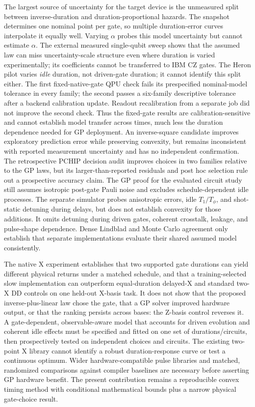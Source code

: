 \documentclass[10pt,letterpaper,journal]{IEEEtran}
\begin{document}
The largest source of uncertainty for the target device is the unmeasured split between inverse-duration and duration-proportional hazards. The snapshot determines one nominal point per gate, so multiple duration-error curves interpolate it equally well. Varying $\alpha$ probes this model uncertainty but cannot estimate $\alpha$. The external measured single-qubit sweep shows that the assumed law can miss uncertainty-scale structure even where duration is varied experimentally; its coefficients cannot be transferred to IBM CZ gates. The Heron pilot varies \emph{idle} duration, not driven-gate duration; it cannot identify this split either. The first fixed-native-gate QPU check fails its prespecified nominal-model tolerance in every family; the second passes a six-family descriptive tolerance after a backend calibration update. Readout recalibration from a separate job did not improve the second check. Thus the fixed-gate results are calibration-sensitive and cannot establish model transfer across times, much less the duration dependence needed for GP deployment. An inverse-square candidate improves exploratory prediction error while preserving convexity, but remains inconsistent with reported measurement uncertainty and has no independent confirmation. The retrospective PCHIP decision audit improves choices in two families relative to the GP laws, but its larger-than-reported residuals and post hoc selection rule out a prospective accuracy claim. The GP proof for the evaluated circuit study still assumes isotropic post-gate Pauli noise and excludes schedule-dependent idle processes. The separate simulator probes anisotropic errors, idle $T_1/T_\phi$, and shot-static detuning during delays, but does not establish convexity for those additions. It omits detuning during driven gates, coherent crosstalk, leakage, and pulse-shape dependence. Dense Lindblad and Monte Carlo agreement only establish that separate implementations evaluate their shared assumed model consistently.

The native X experiment establishes that two supported gate durations can yield different physical returns under a matched schedule, and that a training-selected slow implementation can outperform equal-duration delayed-X and standard two-X DD controls on one held-out X-basis task. It does not show that the proposed inverse-plus-linear law chose the gate, that a GP solver improved hardware output, or that the ranking persists across bases: the Z-basis control reverses it. A gate-dependent, observable-aware model that accounts for driven evolution and coherent idle effects must be specified and fitted on one set of durations/circuits, then prospectively tested on independent choices and circuits. The existing two-point X library cannot identify a robust duration-response curve or test a continuous optimum. Wider hardware-compatible pulse libraries and matched, randomized comparisons against compiler baselines are necessary before asserting GP hardware benefit. The present contribution remains a reproducible convex timing method with conditional mathematical bounds plus a narrow physical gate-choice result.
\end{document}
